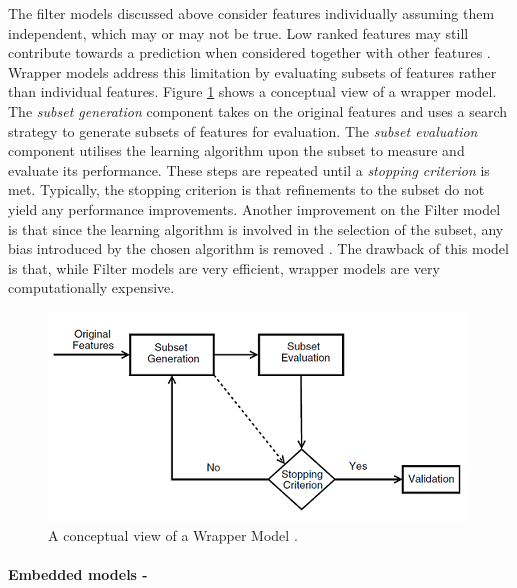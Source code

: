 \documentclass{article}[paper=a4,pagesize=auto,10pt]
\begin{document}
The filter models discussed above consider features individually assuming them independent, which may or may not be true.  Low ranked features may still contribute towards a prediction when considered together with other features \cite{de2015feature}. Wrapper models address this limitation by evaluating subsets of features rather than individual features. Figure \ref{fig:wrapper} shows a conceptual view of a wrapper model.  The \textit{subset generation} component takes on the original features and uses a search strategy to generate subsets of features for evaluation.  The \textit{subset evaluation} component utilises the learning algorithm upon the subset to measure and evaluate its performance.  These steps are repeated until a \textit{stopping criterion} is met.  Typically, the stopping criterion is that refinements to the subset do not yield any performance improvements. Another improvement on the Filter model is that since the learning algorithm is involved in the selection of the subset, any bias introduced by the chosen algorithm is removed \cite{sammut2017encyclopedia}.  The drawback of this model is that, while Filter models are very efficient, wrapper models are very computationally expensive.


\begin{figure}[ht]
  	\includegraphics{graphics/wrapper.png}
  	\centering
  	\caption{A conceptual view of a Wrapper Model \cite{de2015feature}.}
  	\label{fig:wrapper}
\end{figure}



\paragraph{Embedded models -}
\end{document}
